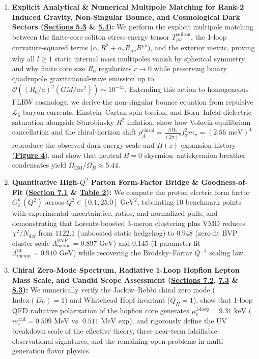\documentclass[10pt,aps,prd,twocolumn,superscriptaddress,nofootinbib,floatfix,longbibliography,showkeys]{revtex4-2}
\begin{document}
\begin{itemize}
\begin{enumerate}
    \item \textbf{Explicit Analytical \& Numerical Multipole Matching for Rank-2 Induced Gravity, Non-Singular Bounce, and Cosmological Dark Sectors (\hyperref[sec:5.3]{Sections 5.3} \& \hyperref[sec:5.4]{5.4}):} We perform the explicit multipole matching between the finite-core soliton stress-energy tensor $T_{\mu\nu}^{\text{soliton}}$, the 1-loop curvature-squared terms ($\alpha_1 R^2 + \alpha_2 R_{\mu\nu}R^{\mu\nu}$), and the exterior metric, proving why all $l \ge 1$ static internal mass multipoles vanish by spherical symmetry and why finite core size $R_0$ regularizes $r \to 0$ while preserving binary quadrupole gravitational-wave emission up to $\mathcal{O}((R_0/a)^2(GM/ac^2)) \sim 10^{-41}$. Extending this action to homogeneous FLRW cosmology, we derive the non-singular bounce equation from repulsive $\mathcal{L}_6$ baryon currents, Einstein--Cartan spin-torsion, and Born--Infeld dielectric saturation alongside Starobinsky $R^2$ inflation, show how Volovik equilibrium cancellation and the chiral-horizon shift $\rho_\Lambda^{\text{chiral}} = \frac{\hbar H_0}{(2\pi)^2}f_\pi^2 m_\pi = (2.56\text{ meV})^4$ reproduce the observed dark energy scale and $H(z)$ expansion history (\textbf{\hyperref[fig:fig4]{Figure 4}}), and show that neutral $B=0$ skyrmion--antiskyrmion breather condensates yield $\Omega_{\text{DM}}/\Omega_B \approx 5.44$.
    \item \textbf{Quantitative High-$Q^2$ Parton Form-Factor Bridge \& Goodness-of-Fit (\hyperref[sec:7.1]{Section 7.1} \& \hyperref[tab:table2]{Table 2}):} We compute the proton electric form factor $G_E^p(Q^2)$ across $Q^2 \in [0.1, 25.0]\text{ GeV}^2$, tabulating 10 benchmark points with experimental uncertainties, ratios, and normalized pulls, and demonstrating that Lorentz-boosted 3-meron clustering plus VMD reduces $\chi^2/N_{\text{dof}}$ from $1122.1$ (unboosted static hedgehog) to $0.948$ (zero-fit BVP cluster scale $\Lambda_{\text{meron}}^{\text{BVP}} = 0.897\text{ GeV}$) and $0.145$ (1-parameter fit $\Lambda_{\text{meron}}^{\text{fit}} = 0.910\text{ GeV}$) while recovering the Brodsky--Farrar $Q^{-4}$ scaling law.
    \item \textbf{Chiral Zero-Mode Spectrum, Radiative 1-Loop Hopfion Lepton Mass Scale, and Candid Scope Assessment (\hyperref[sec:7.2]{Sections 7.2}, \hyperref[sec:7.3]{7.3} \& \hyperref[sec:8.3]{8.3}):} We numerically verify the Jackiw--Rebbi chiral zero mode ($\text{Index}(D_U) = 1$) and Whitehead Hopf invariant ($Q_H = 1$), show that 1-loop QED radiative polarization of the hopfion core generates $\mu_e^{\text{1-loop}} = 9.31\text{ keV}$ ($m_e^{\text{rad}} = 0.509\text{ MeV}$ vs. $0.511\text{ MeV}$ exp), and rigorously define the UV breakdown scale of the effective theory, three near-term falsifiable observational signatures, and the remaining open problems in multi-generation flavor physics.

  \end{enumerate}
\end{itemize}
\end{document}
